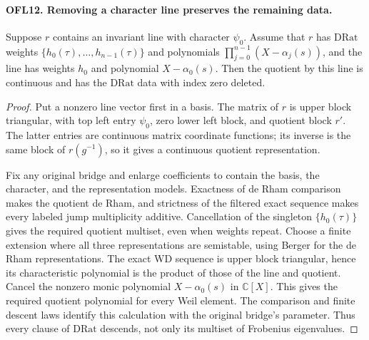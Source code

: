 \documentclass[11pt,a4paper]{article}
\numberwithin{equation}{section}
\theoremstyle{remark}\newtheorem{remark}[theorem]{Remark}
\begin{document}
\paragraph{OFL12. Removing a character line preserves the remaining data.}
\label{claim:OFL12}
Suppose \(r\) contains an invariant line with character
\(\psi_0\).  Assume that \(r\) has \(\mathrm{DRat}\)
weights \(\{h_0(\tau),\ldots,h_{n-1}(\tau)\}\) and
polynomials \(\prod_{j=0}^{n-1}(X-\alpha_j(s))\), and the
line has weights \(h_0\) and polynomial \(X-\alpha_0(s)\).
Then the quotient by this line is continuous and has the
\(\mathrm{DRat}\) data with index zero deleted.
\begin{proof}
Put a nonzero line vector first in a basis.  The matrix of \(r\)
is upper block triangular, with top left entry \(\psi_0\),
zero lower left block, and quotient block \(r'\).
The latter entries are continuous matrix coordinate functions;
its inverse is the same block of \(r(g^{-1})\), so it gives
a continuous quotient representation.

Fix any original bridge and enlarge coefficients to contain the
basis, the character, and the representation models.  Exactness
of de Rham comparison makes the quotient de Rham, and strictness
of the filtered exact sequence makes every labeled jump
multiplicity additive.  Cancellation of the singleton
\(\{h_0(\tau)\}\) gives the required quotient multiset,
even when weights repeat.  Choose a finite extension where all
three representations are semistable, using Berger for the de
Rham representations.  The exact WD sequence is upper block
triangular, hence its characteristic polynomial is the product
of those of the line and quotient.  Cancel the nonzero monic
polynomial \(X-\alpha_0(s)\) in \(\mathbb C[X]\).
This gives the required quotient polynomial for every Weil
element.  The comparison and finite descent laws identify this
calculation with the original bridge's parameter.  Thus every
clause of \(\mathrm{DRat}\) descends, not only its multiset
of Frobenius eigenvalues.
\end{proof}

\end{document}

